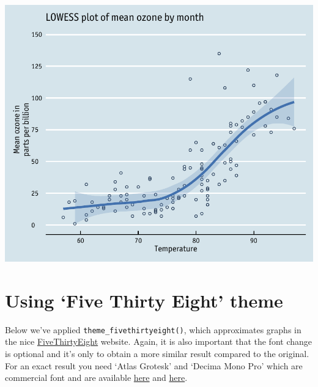 \documentclass[]{article}
\begin{document}
\begin{center}\includegraphics{12_Lowess_Plots_pdf/lowess_19-1} \end{center}

\section{\texorpdfstring{Using `Five Thirty Eight'
theme}{Using Five Thirty Eight theme}}\label{using-five-thirty-eight-theme}

Below we've applied \texttt{theme\_fivethirtyeight()}, which
approximates graphs in the nice
\href{http://fivethirtyeight.com/}{FiveThirtyEight} website. Again, it
is also important that the font change is optional and it's only to
obtain a more similar result compared to the original. For an exact
result you need `Atlas Grotesk' and `Decima Mono Pro' which are
commercial font and are available
\href{https://commercialtype.com/catalog/atlas}{here} and
\href{https://www.myfonts.com/fonts/tipografiaramis/decima-mono-pro/}{here}.
\end{document}
